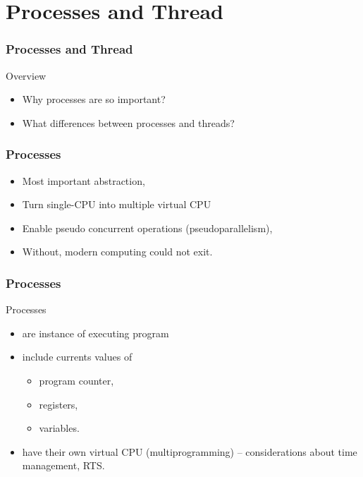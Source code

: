\section{Processes and Thread}
  \begin{frame}
    \frametitle{Processes and Thread}
        \begin{block}{Overview}
          \begin{itemize}
            \item Why processes are so important?
            \item What differences between processes and threads?
          \end{itemize}
        \end{block}
  \end{frame}

  \begin{frame}
    \frametitle{Processes}
        \begin{itemize}
          \item Most important abstraction,
          \item Turn single-CPU into multiple virtual CPU
          \item Enable pseudo concurrent operations (pseudoparallelism),
          \item Without, modern computing could not exit.
        \end{itemize}
  \end{frame}

  \begin{frame}
    \frametitle{Processes}
        \begin{block}{Processes}
          \begin{itemize}
            \item are instance of executing program
            \item include currents values of
              \begin{itemize}
                \item program counter,
                \item registers,
                \item variables.
              \end{itemize}
            \item have their own virtual CPU (multiprogramming) -- considerations about time management, RTS.
          \end{itemize}
        \end{block}
  \end{frame}

